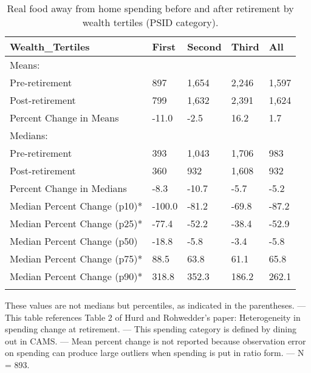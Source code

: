 \begin{table}[tbp] \centering
{}

\caption{Real food away from home spending before and after retirement by wealth tertiles (PSID category).}
\begin{tabularx}{\textwidth}{lCCCC}

\toprule
{Wealth\_Tertiles}&{First}&{Second}&{Third}&{All} \tabularnewline
\midrule\addlinespace[1.5ex]
Means:&&&& \tabularnewline
\midrule Pre-retirement&897&1,654&2,246&1,597 \tabularnewline
Post-retirement&799&1,632&2,391&1,624 \tabularnewline
Percent Change in Means&-11.0&-2.5&16.2&1.7 \tabularnewline
\midrule Medians:&&&& \tabularnewline
\midrule Pre-retirement&393&1,043&1,706&983 \tabularnewline
Post-retirement&360&932&1,608&932 \tabularnewline
Percent Change in Medians&-8.3&-10.7&-5.7&-5.2 \tabularnewline
Median Percent Change (p10)*&-100.0&-81.2&-69.8&-87.2 \tabularnewline
Median Percent Change (p25)*&-77.4&-52.2&-38.4&-52.9 \tabularnewline
Median Percent Change (p50)&-18.8&-5.8&-3.4&-5.8 \tabularnewline
Median Percent Change (p75)*&88.5&63.8&61.1&65.8 \tabularnewline
Median Percent Change (p90)*&318.8&352.3&186.2&262.1 \tabularnewline
\bottomrule \addlinespace[1.5ex]

\end{tabularx}
\begin{flushleft}
\footnotesize *These values are not medians but percentiles, as indicated in the parentheses. \linebreak --- \linebreak This table references Table 2 of Hurd and Rohwedder's paper: Heterogeneity in spending change at retirement. \linebreak --- \linebreak This spending category is defined by dining out in CAMS. \linebreak --- \linebreak Mean percent change is not reported because observation error on spending can produce large outliers when spending is put in ratio form. \linebreak --- \linebreak N = 893.
\end{flushleft}
\end{table}
